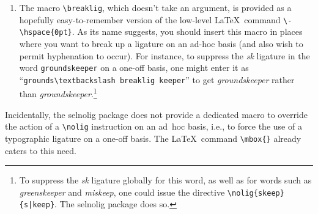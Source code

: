 \documentclass[12pt]{article}
\newcommand{\pkg}[1]{\textsf{#1}}
\newcommand{\cmmd}[1]{\texttt{\textbackslash #1}}
\begin{document}
\begin{enumerate}
Observe that we make use of the case sensitivity in the final \cmmd{nolig} instruction in order to avoid having it apply to words such as \enquote{Visumpflicht} (visa requirement). 

\item The macro \cmmd{breaklig}, which doesn't take an argument, is provided as a hopefully easy-to-remember version of the low-level \LaTeX\ command \Verb+\-\hspace{0pt}+. As its name suggests, you should insert this macro in places where you want to break up a ligature on an ad-hoc basis (and also wish to permit hyphenation to occur). For instance, to suppress the \emph{\mbox{sk}} ligature in the word \Verb+groundskeeper+ on a one-off basis, one might enter it as \enquote{\Verb+grounds\textbackslash breaklig keeper+} to get {\ebg \emph{groundskeeper} rather than \emph{ground\mbox{sk}eeper}.}\footnote{To suppress the {\ebg \emph{\mbox{sk}}} ligature globally for this word, as well as for words such as {\ebg \emph{greenskeeper}} and {\ebg \emph{miskeep}}, one could issue the directive \Verb+\nolig{skeep}{s|keep}+. The \pkg{selnolig} package does so.}

\end{enumerate}

Incidentally, the \pkg{selnolig} package does not provide a dedicated macro to override the action of a \cmmd{nolig} instruction on an ad~hoc basis, i.e., to force the use of a typographic ligature on a one-off basis. The \LaTeX\ command \Verb+\mbox{}+ already caters to this need.
\end{document}
